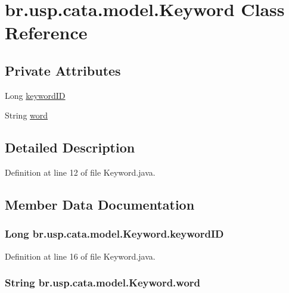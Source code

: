 \hypertarget{classbr_1_1usp_1_1cata_1_1model_1_1_keyword}{\section{br.\+usp.\+cata.\+model.\+Keyword Class Reference}
\label{classbr_1_1usp_1_1cata_1_1model_1_1_keyword}
}
\subsection*{Private Attributes}
\begin{DoxyCompactItemize}
\item 
Long \hyperlink{classbr_1_1usp_1_1cata_1_1model_1_1_keyword_ab8de84da516f53ae23ccd4505935ada3}{keyword\+I\+D}
\item 
String \hyperlink{classbr_1_1usp_1_1cata_1_1model_1_1_keyword_af4ce6853414ee1b0ee6d550c0cd5179d}{word}
\end{DoxyCompactItemize}


\subsection{Detailed Description}


Definition at line 12 of file Keyword.\+java.



\subsection{Member Data Documentation}
\hypertarget{classbr_1_1usp_1_1cata_1_1model_1_1_keyword_ab8de84da516f53ae23ccd4505935ada3}{
\subsubsection[{keyword\+I\+D}]{\setlength{\rightskip}{0pt plus 5cm}Long br.\+usp.\+cata.\+model.\+Keyword.\+keyword\+I\+D\hspace{0.3cm}{\ttfamily [private]}}}\label{classbr_1_1usp_1_1cata_1_1model_1_1_keyword_ab8de84da516f53ae23ccd4505935ada3}


Definition at line 16 of file Keyword.\+java.

\hypertarget{classbr_1_1usp_1_1cata_1_1model_1_1_keyword_af4ce6853414ee1b0ee6d550c0cd5179d}{
\subsubsection[{word}]{\setlength{\rightskip}{0pt plus 5cm}String br.\+usp.\+cata.\+model.\+Keyword.\+word\hspace{0.3cm}{\ttfamily [private]}}}\label{classbr_1_1usp_1_1cata_1_1model_1_1_keyword_af4ce6853414ee1b0ee6d550c0cd5179d}


